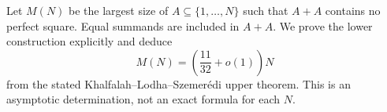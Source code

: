 Let $M(N)$ be the largest size of $A\subseteq\{1,\ldots,N\}$ such that $A+A$ contains no perfect square. Equal summands are included in $A+A$. We prove the lower construction explicitly and deduce
\[M(N)=\left(\frac{11}{32}+o(1)\right)N
\]
from the stated Khalfalah--Lodha--Szemer\'edi upper theorem. This is an asymptotic determination, not an exact formula for each $N$.
